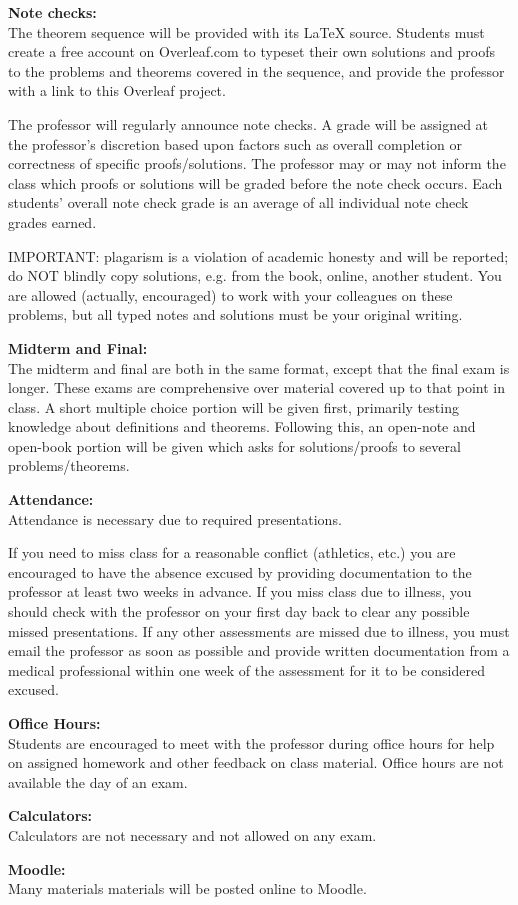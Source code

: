 {\textbf{Note checks:} \\
The theorem sequence will be provided with its \LaTeX{} source. Students must
create a free account on Overleaf.com to typeset their own solutions and
proofs to the problems and theorems covered in the sequence, and provide
the professor with a link to this Overleaf project.

The professor will regularly announce
note checks. A grade will be assigned at the professor's discretion based
upon factors such as overall completion or correctness of specific
proofs/solutions.
The professor may or may not inform the class which proofs or solutions will
be graded before the note check occurs.
Each students' overall note check grade is an average of all individual
note check grades earned.

IMPORTANT: plagarism is a violation
of academic honesty and will be reported; do NOT blindly copy solutions, e.g.
from the book, online, another student.
You are allowed (actually, encouraged) to work
with your colleagues on these problems, but all typed notes and solutions
must be your original writing.

\textbf{Midterm and Final:} \\
The midterm and final are both in the same format, except that the final
exam is longer. These exams are comprehensive over material covered up
to that point in class. A short multiple choice portion will be given first,
primarily testing knowledge about definitions and theorems. Following this, an
open-note and open-book portion will be given which asks for solutions/proofs
to several problems/theorems.

\newpage
\textbf{Attendance:} \\
Attendance is necessary due to
required presentations.

If you need to miss
class for a reasonable conflict (athletics, etc.) you are encouraged to
have the absence excused by providing documentation to
the professor at least two weeks in advance.
If you miss class due to illness, you should check with the professor
on your first day back to clear any possible missed presentations.
If any other assessments are missed due to illness, you
must email the professor as soon as possible and provide written
documentation from a medical professional within one week of the assessment
for it to be considered excused.

\textbf{Office Hours:} \\
Students are encouraged to meet with the professor during office hours
for help on assigned homework and other feedback on class material.
Office hours are not available the day of an exam.

\textbf{Calculators:} \\
Calculators are not necessary and not allowed on any exam.

\textbf{Moodle:}\\
Many materials materials will be posted online to Moodle.
}

